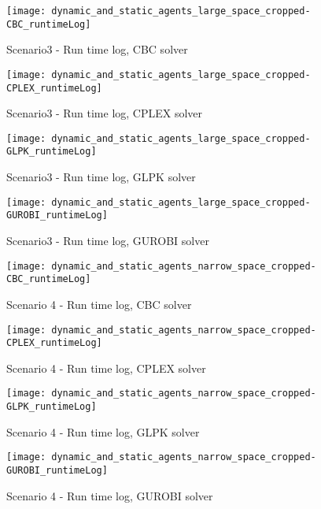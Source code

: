 \begin{figure}[H]
	\centering
	\texttt{[image: dynamic\_and\_static\_agents\_large\_space\_cropped-CBC\_runtimeLog]}
	\caption{Scenario3 - Run time log, CBC solver}
	\label{fig:runtimelog_scenario3-CBC}
\end{figure}
\begin{figure}[H]
	\centering
	\texttt{[image: dynamic\_and\_static\_agents\_large\_space\_cropped-CPLEX\_runtimeLog]}
	\caption{Scenario3 - Run time log, CPLEX solver}
	\label{fig:runtimelog_scenario3-CPLEX}
\end{figure}
\begin{figure}[H]
	\centering
	\texttt{[image: dynamic\_and\_static\_agents\_large\_space\_cropped-GLPK\_runtimeLog]}
	\caption{Scenario3 - Run time log, GLPK solver}
	\label{fig:runtimelog_scenario3-GLPK}
\end{figure}
\begin{figure}[H]
	\centering
	\texttt{[image: dynamic\_and\_static\_agents\_large\_space\_cropped-GUROBI\_runtimeLog]}
	\caption{Scenario3 - Run time log, GUROBI solver}
	\label{fig:runtimelog_scenario3-GUROBI}
\end{figure}


\begin{figure}[H]
	\centering
	\texttt{[image: dynamic\_and\_static\_agents\_narrow\_space\_cropped-CBC\_runtimeLog]}
	\caption{Scenario 4 - Run time log, CBC solver}
	\label{fig:runtimelog_scenario4-CBC}
\end{figure}
\begin{figure}[H]
	\centering
	\texttt{[image: dynamic\_and\_static\_agents\_narrow\_space\_cropped-CPLEX\_runtimeLog]}
	\caption{Scenario 4 - Run time log, CPLEX solver}
	\label{fig:runtimelog_scenario4-CPLEX}
\end{figure}
\begin{figure}[H]
	\centering
	\texttt{[image: dynamic\_and\_static\_agents\_narrow\_space\_cropped-GLPK\_runtimeLog]}
	\caption{Scenario 4 - Run time log, GLPK solver}
	\label{fig:runtimelog_scenario4-GLPK}
\end{figure}
\begin{figure}[H]
	\centering
	\texttt{[image: dynamic\_and\_static\_agents\_narrow\_space\_cropped-GUROBI\_runtimeLog]}
	\caption{Scenario 4 - Run time log, GUROBI solver}
	\label{fig:runtimelog_scenario4-GUROBI}
\end{figure}


